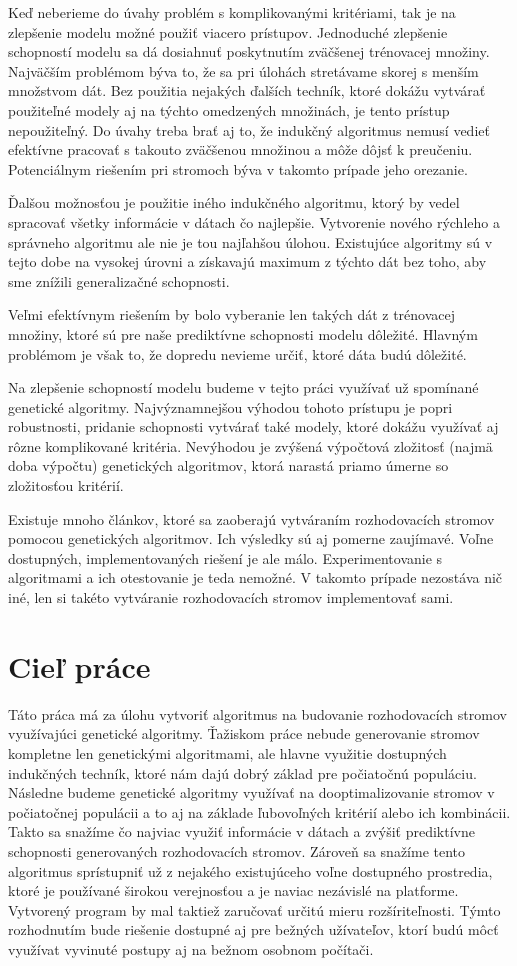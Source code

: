 Keď neberieme do úvahy problém s komplikovanými kritériami, tak je na zlepšenie modelu možné použiť viacero prístupov. Jednoduché zlepšenie schopností modelu sa dá dosiahnuť poskytnutím zväčšenej trénovacej množiny. Najväčším problémom býva to, že sa pri úlohách stretávame skorej s menším množstvom dát. Bez použitia nejakých ďalších techník, ktoré dokážu vytvárať použiteľné modely aj na týchto omedzených množinách, je tento prístup nepoužiteľný. Do úvahy treba brať aj to, že indukčný algoritmus nemusí vedieť efektívne pracovať s takouto zväčšenou množinou a môže dôjsť k preučeniu. Potenciálnym riešením pri stromoch býva v takomto prípade jeho orezanie.

Ďalšou možnosťou je použitie iného indukčného algoritmu, ktorý by vedel spracovať všetky informácie v dátach čo najlepšie. Vytvorenie nového rýchleho a správneho algoritmu ale nie je tou najľahšou úlohou. Existujúce algoritmy sú v tejto dobe na vysokej úrovni a získavajú maximum z týchto dát bez toho, aby sme znížili generalizačné schopnosti.

Veľmi efektívnym riešením by bolo vyberanie len takých dát z trénovacej množiny, ktoré sú pre naše prediktívne schopnosti modelu dôležité. Hlavným problémom je však to, že dopredu nevieme určiť, ktoré dáta budú dôležité.

Na zlepšenie schopností modelu budeme v tejto práci využívať už spomínané genetické algoritmy. Najvýznamnejšou výhodou tohoto prístupu je popri robustnosti, pridanie schopnosti vytvárať také modely, ktoré dokážu využívať aj rôzne komp\-likované kritéria. Nevýhodou je zvýšená výpočtová zložitosť (najmä doba výpočtu) genetických algoritmov, ktorá narastá priamo úmerne so zložitosťou kritérií.

Existuje mnoho článkov, ktoré sa zaoberajú vytváraním rozhodovacích stromov pomocou genetických algoritmov. Ich výsledky sú aj pomerne zaujímavé. Voľne dostupných, implementovaných riešení je ale málo. Experimentovanie s algoritmami a ich otestovanie je teda nemožné. V takomto prípade nezostáva nič iné, len si takéto vytváranie rozhodovacích stromov implementovať sami.
\section{Cieľ práce}
Táto práca má za úlohu vytvoriť algoritmus na budovanie rozhodovacích stromov využívajúci genetické algoritmy. Ťažiskom práce nebude generovanie stromov kompletne len genetickými algoritmami, ale hlavne využitie dostupných indukčných techník, ktoré nám dajú dobrý základ pre počiatočnú populáciu. Následne budeme genetické algoritmy využívať na dooptimalizovanie stromov v počiatočnej populácii a to aj na základe ľubovoľných kritérií alebo ich kombinácii. Takto sa snažíme čo najviac využiť informácie v dátach a zvýšiť prediktívne schopnosti generovaných rozhodovacích stromov. Zároveň sa snažíme tento algoritmus sprístupniť už z nejakého existujúceho voľne dostupného prostredia, ktoré je používané širokou verejnosťou a je naviac nezávislé na platforme. Vytvorený program by mal taktiež zaručovať určitú mieru rozšíriteľnosti. Týmto rozhodnutím bude riešenie dostupné aj pre bežných užívateľov, ktorí budú môcť využívat vyvinuté postupy aj na bežnom osobnom počítači. 

